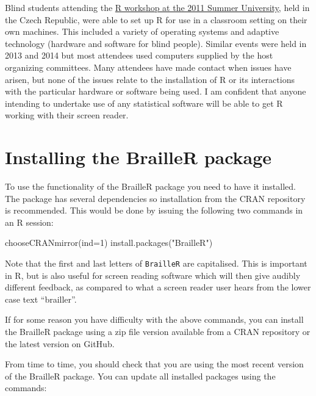 \documentclass[
]{book}
\newenvironment{Shaded}{\begin{snugshade}}{\end{snugshade}}
\newcommand{\AttributeTok}[1]{\textcolor[rgb]{0.77,0.63,0.00}{#1}}
\newcommand{\DecValTok}[1]{\textcolor[rgb]{0.00,0.00,0.81}{#1}}
\newcommand{\FunctionTok}[1]{\textcolor[rgb]{0.00,0.00,0.00}{#1}}
\newcommand{\NormalTok}[1]{#1}
\newcommand{\StringTok}[1]{\textcolor[rgb]{0.31,0.60,0.02}{#1}}
\begin{document}
Blind students attending the \href{http://icchp-su.net/?q=node/108}{R workshop at the 2011 Summer University,} held in the Czech Republic, were able to set up R for use in a classroom setting on their own machines. This included a variety of operating systems and adaptive technology (hardware and software for blind people). Similar events were held in 2013 and 2014 but most attendees used computers supplied by the host organizing committees. Many attendees have made contact when issues have arisen, but none of the issues relate to the installation of R or its interactions with the particular hardware or software being used. I am confident that anyone intending to undertake use of any statistical software will be able to get R working with their screen reader.

\hypertarget{installing-the-brailler-package}{%
\section{Installing the BrailleR package}\label{installing-the-brailler-package}}

To use the functionality of the BrailleR package you need to have it installed. The package has several dependencies so installation from the CRAN repository is recommended. This would be done by issuing the following two commands in an R session:

\begin{Shaded}
\begin{Highlighting}[]
\FunctionTok{chooseCRANmirror}\NormalTok{(}\AttributeTok{ind=}\DecValTok{1}\NormalTok{)}
\FunctionTok{install.packages}\NormalTok{(}\StringTok{"BrailleR"}\NormalTok{)}
\end{Highlighting}
\end{Shaded}

Note that the first and last letters of \texttt{BrailleR} are capitalised. This is important in R, but is also useful for screen reading software which will then give audibly different feedback, as compared to what a screen reader user hears from the lower case text ``brailler''.

If for some reason you have difficulty with the above commands, you can install the BrailleR package using a zip file version available from a CRAN repository or the latest version on GitHub.

From time to time, you should check that you are using the most recent version of the BrailleR package. You can update all installed packages using the commands:
\end{document}
